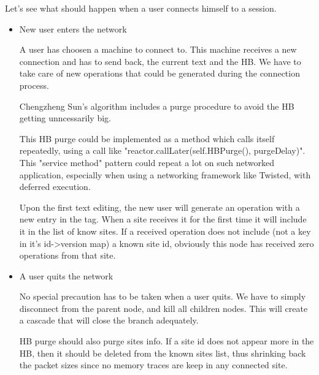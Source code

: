 \documentclass{report}
\begin{document}
Let's see what should happen when a user connects himself to a session.
\begin{itemize}
\item New user enters the network

A user has choosen a machine to connect to. This machine receives a new connection and has to send back, the current text and the HB. We have to take care of new operations that could be generated during the connection process.

Chengzheng Sun's algorithm includes a purge procedure to avoid the HB getting unncessarily big.

This HB purge could be implemented as a method which calls itself repeatedly, using a call like "reactor.callLater(self.HBPurge(), purgeDelay)". This "service method" pattern could repeat a lot on such networked application, especially when using a networking framework like Twisted, with deferred execution.

Upon the first text editing, the new user will generate an operation with a new entry in the tag. When a site receives it for the first time it will include it in the list of know sites. If a received operation does not include (not a key in it's id->version map) a known site id, obviously this node has received zero operations from that site.


\item A user quits the network

No special precaution has to be taken when a user quits. We have to simply disconnect from the parent node, and kill all children nodes. This will create a cascade that will close the branch adequately.



      
HB purge should also purge sites info. If a site id does not appear more in the HB, then it should be deleted from the known sites list, thus shrinking back the packet sizes since no memory traces are keep in any connected site.
\end{itemize}
\end{document}
